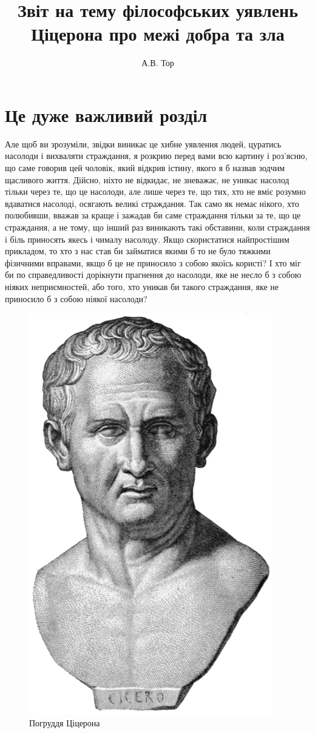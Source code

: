 \documentclass{report_ndr}
\title{Звіт на тему філософських уявлень Ціцерона про межі добра та зла}
\author{А.В. Тор}
\begin{document}
\maketitle

\tableofcontents

\chapter{Це дуже важливий розділ}

Але щоб ви зрозуміли, звідки виникає це хибне уявлення людей, цуратись насолоди
і вихваляти страждання, я розкрию перед вами всю картину і роз’ясню, що саме
говорив цей чоловік, який відкрив істину, якого я б назвав зодчим щасливого
життя. Дійсно, ніхто не відкидає, не зневажає, не уникає насолод тільки через
те, що це насолоди, але лише через те, що тих, хто не вміє розумно вдаватися
насолоді, осягають великі страждання. Так само як немає нікого, хто полюбивши,
вважав за краще і зажадав би саме страждання тільки за те, що це страждання, а
не тому, що інший раз виникають такі обставини, коли страждання і біль приносять
якесь і чималу насолоду. Якщо скористатися найпростішим прикладом, то хто з нас
став би займатися якими б то не було тяжкими фізичними вправами, якщо б це не
приносило з собою якоїсь користі? І хто міг би по справедливості дорікнути
прагнення до насолоди, яке не несло б з собою ніяких неприємностей, або того,
хто уникав би такого страждання, яке не приносило б з собою ніякої насолоди?

\begin{figure}[h]
\centering
\includegraphics[scale=0.3]{400px-Cicero.PNG}
\caption{Погруддя Ціцерона}
\label{fig:image}
\end{figure}
\end{document}
